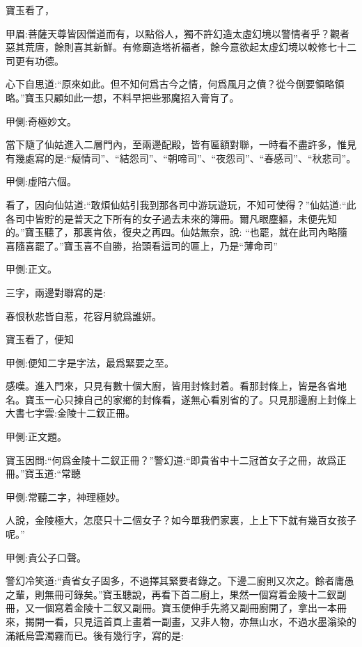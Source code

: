 \begin{parag}
    寶玉看了，\begin{note}甲眉:菩薩天尊皆因僧道而有，以點俗人，獨不許幻造太虛幻境以警情者乎？觀者惡其荒唐，餘則喜其新鮮。有修廟造塔祈福者，餘今意欲起太虛幻境以較修七十二司更有功德。\end{note}心下自思道:“原來如此。但不知何爲古今之情，何爲風月之債？從今倒要領略領略。”寶玉只顧如此一想，不料早把些邪魔招入膏肓了。\begin{note}甲側:奇極妙文。\end{note}當下隨了仙姑進入二層門內，至兩邊配殿，皆有匾額對聯，一時看不盡許多，惟見有幾處寫的是:“癡情司”、“結怨司”、“朝啼司”、“夜怨司”、“春感司”、“秋悲司”。\begin{note}甲側:虛陪六個。\end{note}看了，因向仙姑道:“敢煩仙姑引我到那各司中游玩遊玩，不知可使得？”仙姑道:“此各司中皆貯的是普天之下所有的女子過去未來的簿冊。爾凡眼塵軀，未便先知的。”寶玉聽了，那裏肯依，復央之再四。仙姑無奈，說: “也罷，就在此司內略隨喜隨喜罷了。”寶玉喜不自勝，抬頭看這司的匾上，乃是“薄命司”\begin{note}甲側:正文。\end{note}三字，兩邊對聯寫的是:
\end{parag}


\begin{poem}\begin{pl}春恨秋悲皆自惹，花容月貌爲誰妍。\end{pl}\end{poem}


\begin{parag}
    寶玉看了，便知\begin{note}甲側:便知二字是字法，最爲緊要之至。\end{note}感嘆。進入門來，只見有數十個大廚，皆用封條封着。看那封條上，皆是各省地名。寶玉一心只揀自己的家鄉的封條看，遂無心看別省的了。只見那邊廚上封條上大書七字雲:金陵十二釵正冊。\begin{note}甲側:正文題。\end{note}寶玉因問:“何爲金陵十二釵正冊？”警幻道:“即貴省中十二冠首女子之冊，故爲正冊。”寶玉道:“常聽\begin{note}甲側:常聽二字，神理極妙。\end{note}人說，金陵極大，怎麼只十二個女子？如今單我們家裏，上上下下就有幾百女孩子呢。”\begin{note}甲側:貴公子口聲。\end{note}警幻冷笑道:“貴省女子固多，不過擇其緊要者錄之。下邊二廚則又次之。餘者庸愚之輩，則無冊可錄矣。”寶玉聽說，再看下首二廚上，果然一個寫着金陵十二釵副冊，又一個寫着金陵十二釵又副冊。寶玉便伸手先將又副冊廚開了，拿出一本冊來，揭開一看，只見這首頁上畫着一副畫，又非人物，亦無山水，不過水墨滃染的滿紙烏雲濁霧而已。後有幾行字，寫的是:
\end{parag}


